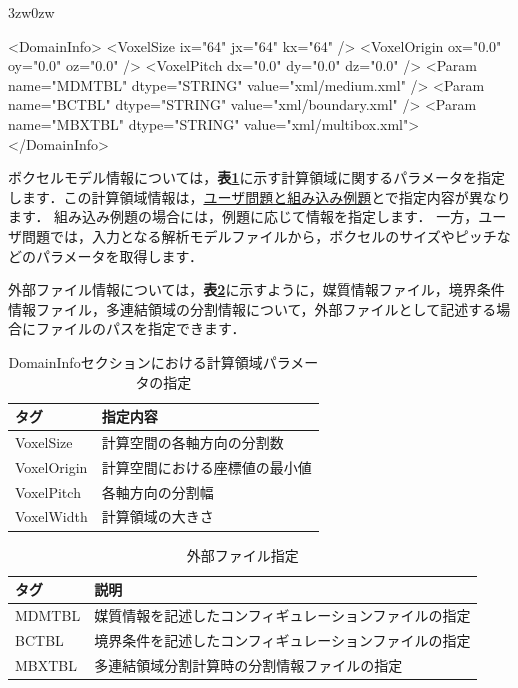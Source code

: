 \begin{indentation}{3zw}{0zw}

{\small
\begin{program}
<DomainInfo>
  <VoxelSize   ix="64" jx="64" kx="64" />
  <VoxelOrigin ox="0.0" oy="0.0" oz="0.0" />
  <VoxelPitch  dx="0.0" dy="0.0" dz="0.0" />
  <Param name="MDMTBL" dtype="STRING" value="xml/medium.xml" />
  <Param name="BCTBL"  dtype="STRING" value="xml/boundary.xml" />
  <Param name="MBXTBL" dtype="STRING" value="xml/multibox.xml">
</DomainInfo>
\end{program}
}

ボクセルモデル情報については，\textbf{表\ref{tbl:voxel info}}に示す計算領域に関するパラメータを指定します．この計算領域情報は，\hyperlink{tgt:example}{ユーザ問題と組み込み例題}とで指定内容が異なります．
組み込み例題の場合には，例題に応じて情報を指定します．
一方，ユーザ問題では，入力となる解析モデルファイルから，ボクセルのサイズやピッチなどのパラメータを取得します．

外部ファイル情報については，\textbf{表\ref{tbl:file info}}に示すように，媒質情報ファイル，境界条件情報ファイル，多連結領域の分割情報について，外部ファイルとして記述する場合にファイルのパスを指定できます．

\begin{table}[htdp]
\caption{DomainInfoセクションにおける計算領域パラメータの指定}
\begin{center}
\small
\begin{tabular}{ll} \toprule
タグ & 指定内容\\ \midrule
VoxelSize & 計算空間の各軸方向の分割数\\
VoxelOrigin & 計算空間における座標値の最小値\\
VoxelPitch & 各軸方向の分割幅\\
VoxelWidth & 計算領域の大きさ\\ \bottomrule
\end{tabular}
\end{center}
\label{tbl:voxel info}
\end{table}

\begin{table}[htdp]
\caption{外部ファイル指定}
\begin{center}
\small
\begin{tabular}{ll} \toprule
タグ & 説明\\ \midrule
MDMTBL & 媒質情報を記述したコンフィギュレーションファイルの指定\\
BCTBL  & 境界条件を記述したコンフィギュレーションファイルの指定\\
MBXTBL & 多連結領域分割計算時の分割情報ファイルの指定\\ \bottomrule
\end{tabular}
\end{center}
\label{tbl:file info}
\end{table}

\end{indentation}

